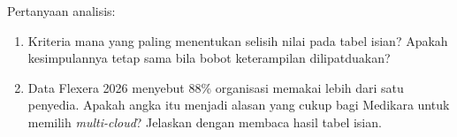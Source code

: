 Pertanyaan analisis:
\begin{enumerate}
  \item Kriteria mana yang paling menentukan selisih nilai pada tabel isian? Apakah
        kesimpulannya tetap sama bila bobot keterampilan dilipatduakan?
  \item Data Flexera 2026 menyebut 88\% organisasi memakai lebih dari satu penyedia. Apakah
        angka itu menjadi alasan yang cukup bagi Medikara untuk memilih \textit{multi-cloud}?
        Jelaskan dengan membaca hasil tabel isian.
\end{enumerate}
